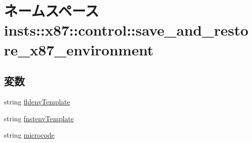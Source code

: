 \hypertarget{namespaceinsts_1_1x87_1_1control_1_1save__and__restore__x87__environment}{
\section{ネームスペース insts::x87::control::save\_\-and\_\-restore\_\-x87\_\-environment}
\label{namespaceinsts_1_1x87_1_1control_1_1save__and__restore__x87__environment}
}
\subsection*{変数}
\begin{DoxyCompactItemize}
\item 
string \hyperlink{namespaceinsts_1_1x87_1_1control_1_1save__and__restore__x87__environment_a644e1745a1988b0b33eaa88f57b12275}{fldenvTemplate}
\item 
string \hyperlink{namespaceinsts_1_1x87_1_1control_1_1save__and__restore__x87__environment_a6525b04e77de26872497b0caec47c0e7}{fnstenvTemplate}
\item 
string \hyperlink{namespaceinsts_1_1x87_1_1control_1_1save__and__restore__x87__environment_a770f11a173e99389a8802f0107ed8f52}{microcode}
\end{DoxyCompactItemize}


